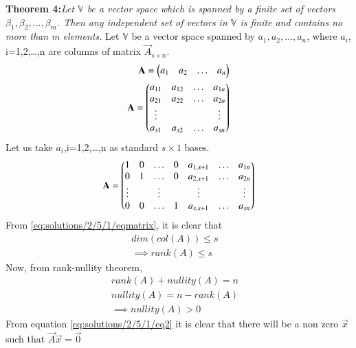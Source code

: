 \textbf{Theorem 4:}\textit{Let $\mathbb{V}$ be a vector space which is spanned by a finite set of vectors $\beta_1,\beta_2,...,\beta_m$. Then any independent set of vectors in $\mathbb{V}$ is finite and contains no more than m elements.}
Let $\mathbb{V}$ be a vector space spanned by $a_1,a_2,\dots,a_n$, where $a_i$, i=1,2,\dots,n are columns of matrix $\vec{A}_{s\times n}$.
\begin{align}
    \mathbf{A}=\begin{pmatrix}a_1&a_2&\dots&a_n\end{pmatrix}\\
    \mathbf{A}=\begin{pmatrix}a_{11}&a_{12}&\dots&a_{1n}\\a_{21}&a_{22}&\dots&a_{2n}\\\vdots&&&\vdots\\a_{s1}&a_{s2}&\dots&a_{sn}\end{pmatrix}
\end{align}
Let us take ${a_i}$,i=1,2,\dots,n as standard ${s\times1}$ bases.\newline 
\begin{align}
     \mathbf{A}=\begin{pmatrix}1&0&\dots&0&a_{1,s+1}&\dots&a_{1n}\\0&1&\dots&0&a_{2,s+1}&\dots&a_{2n}\\\vdots&&\vdots&&\vdots&&\vdots\\0&0&\dots&1&a_{s,s+1}&\dots&a_{sn}\end{pmatrix}\label{eq:solutions/2/5/1/eqmatrix}
\end{align}
From \eqref{eq:solutions/2/5/1/eqmatrix}, it is clear that
\begin{align}
    dim(col(A))\leq s&\\
    \implies rank(A)\leq s&
\end{align}
Now, from rank-nullity theorem,
    \begin{align}
    rank(A)+nullity(A)=n&\\
    nullity(A)=n-rank(A)&\\
   \implies nullity(A)>0& \label{eq:solutions/2/5/1/eq2}
    \end{align}
From equation \eqref{eq:solutions/2/5/1/eq2} it is clear that there will be a non zero $\vec{x}$ such that $\vec{A}\vec{x}=\vec{0}$
